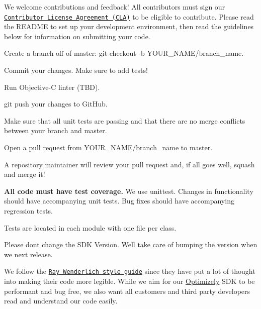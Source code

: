 We welcome contributions and feedback! All contributors must sign our \href{https://docs.google.com/a/optimizely.com/forms/d/e/1FAIpQLSf9cbouWptIpMgukAKZZOIAhafvjFCV8hS00XJLWQnWDFtwtA/viewform}{\tt Contributor License Agreement (C\+LA)} to be eligible to contribute. Please read the R\+E\+A\+D\+ME to set up your development environment, then read the guidelines below for information on submitting your code.


\begin{DoxyEnumerate}
\item Create a branch off of {\ttfamily master}\+: {\ttfamily git checkout -\/b Y\+O\+U\+R\+\_\+\+N\+A\+M\+E/branch\+\_\+name}.
\item Commit your changes. Make sure to add tests!
\item Run Objective-\/C linter (T\+BD).
\item {\ttfamily git push} your changes to Git\+Hub.
\item Make sure that all unit tests are passing and that there are no merge conflicts between your branch and {\ttfamily master}.
\item Open a pull request from {\ttfamily Y\+O\+U\+R\+\_\+\+N\+A\+M\+E/branch\+\_\+name} to {\ttfamily master}.
\item A repository maintainer will review your pull request and, if all goes well, squash and merge it!
\end{DoxyEnumerate}


\begin{DoxyItemize}
\item {\bfseries All code must have test coverage.} We use unittest. Changes in functionality should have accompanying unit tests. Bug fixes should have accompanying regression tests.
\begin{DoxyItemize}
\item Tests are located in each module with one file per class.
\end{DoxyItemize}
\item Please don\textquotesingle{}t change the S\+DK Version. We\textquotesingle{}ll take care of bumping the version when we next release.
\end{DoxyItemize}

We follow the \href{https://github.com/raywenderlich/objective-c-style-guide}{\tt Ray Wenderlich style guide} since they have put a lot of thought into making their code more legible. While we aim for our \mbox{\hyperlink{interface_optimizely}{Optimizely}} S\+DK to be performant and bug free, we also want all customers and third party developers read and understand our code easily.

